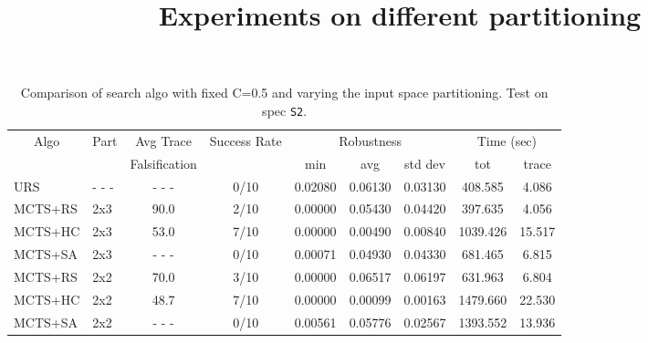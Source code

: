 \documentclass[11pt]{article}
\begin{document}
\begin{table}[ht]
\centering
\title{Experiments on different partitioning}
\begin{tabular}{|l|l|c|c|c|c|c|c|c|}
\hline
\multicolumn{1}{|c|}{\multirow{2}{*}{Algo}} & \multirow{2}{*}{Part} & Avg Trace               & \multirow{2}{*}{Success Rate} & \multicolumn{3}{c|}{Robustness} & \multicolumn{2}{c|}{Time (sec)} \\ \cline{5-9} 
\multicolumn{1}{|c|}{}                      &                    & Falsification           &                               & min      & avg      & std dev  & tot        & trace        \\ \hline
URS                                         & - - -              & - - -                   & 0/10                          & 0.02080  & 0.06130  & 0.03130  &  408.585   &  4.086       \\ \hline
MCTS+RS                                     & 2x3                &  90.0                   & 2/10                          & 0.00000  & 0.05430  & 0.04420  &  397.635   &  4.056       \\
MCTS+HC                                     & 2x3                &  53.0                   & 7/10                          & 0.00000  & 0.00490  & 0.00840  & 1039.426   & 15.517       \\
MCTS+SA                                     & 2x3                & - - -                   & 0/10                          & 0.00071  & 0.04930  & 0.04330  &  681.465   &  6.815       \\ \hline

MCTS+RS                                     & 2x2                &  70.0                   & 3/10                          & 0.00000  & 0.06517  & 0.06197  &  631.963   &  6.804       \\
MCTS+HC                                     & 2x2                &  48.7                   & 7/10                          & 0.00000  & 0.00099  & 0.00163  & 1479.660   & 22.530       \\
MCTS+SA                                     & 2x2                & - - -                   & 0/10                          & 0.00561  & 0.05776  & 0.02567  & 1393.552   & 13.936       \\ \hline
\end{tabular}
\caption{Comparison of search algo with fixed C=0.5 and varying the input space partitioning. Test on spec \texttt{S2}.}
\end{table}
\end{document}
